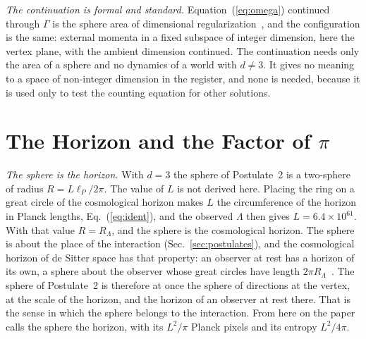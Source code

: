 \documentclass[aps,prd,twocolumn,superscriptaddress,nofootinbib]{revtex4-2}
\begin{document}
\textit{The continuation is formal and standard.} Equation~(\ref{eq:omega}) continued through $\Gamma$ is the sphere area of dimensional regularization~\cite{thooft1972}, and the configuration is the same: external momenta in a fixed subspace of integer dimension, here the vertex plane, with the ambient dimension continued. The continuation needs only the area of a sphere and no dynamics of a world with $d \ne 3$. It gives no meaning to a space of non-integer dimension in the register, and none is needed, because it is used only to test the counting equation for other solutions.

\section{The Horizon and the Factor of $\pi$}
\label{sec:pi}

\textit{The sphere is the horizon.} With $d = 3$ the sphere of Postulate~2 is a two-sphere of radius $R = L\ell_P/2\pi$. The value of $L$ is not derived here. Placing the ring on a great circle of the cosmological horizon makes $L$ the circumference of the horizon in Planck lengths, Eq.~(\ref{eq:ident}), and the observed $\Lambda$ then gives $L = 6.4\times10^{61}$. With that value $R = R_\Lambda$, and the sphere is the cosmological horizon. The sphere is about the place of the interaction (Sec.~\ref{sec:postulates}), and the cosmological horizon of de Sitter space has that property: an observer at rest has a horizon of its own, a sphere about the observer whose great circles have length $2\pi R_\Lambda$~\cite{gibbonshawking1977}. The sphere of Postulate~2 is therefore at once the sphere of directions at the vertex, at the scale of the horizon, and the horizon of an observer at rest there. That is the sense in which the sphere belongs to the interaction. From here on the paper calls the sphere the horizon, with its $L^2/\pi$ Planck pixels and its entropy $L^2/4\pi$.
\end{document}
